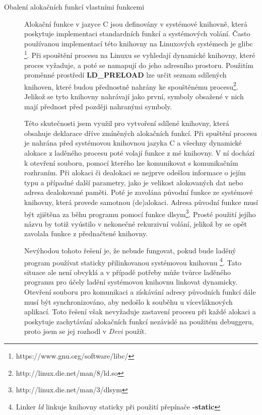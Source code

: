 \documentclass[bc,male,python,dept460]{diploma}						%
\newcommand{\parspace}[1][]{
	\ifthenelse{\isempty{#1}}{\vspace{5mm}}{\vspace{#1}}
	\par
}
\begin{document}
\begin{description}
\begin{description}
				\item[Obalení alokačních funkcí vlastními funkcemi] Alokační funkce v jazyce C jsou definovány v systémové knihovně, která poskytuje
				implementaci standardních funkcí a systémových volání. Často používanou implementací této knihovny na Linuxových systémech je glibc
				\footnote{https://www.gnu.org/software/libc/}. Při spouštění procesu na Linuxu se vyhledají dynamické knihovny, které proces vyžaduje,
				a poté se namapují do jeho adresního prostoru. Použitím proměnné prostředí \textbf{LD\_PRELOAD} lze určit
				seznam sdílených knihoven, které budou přednostně nahrány ke spouštěnému procesu\footnote{http://linux.die.net/man/8/ld.so}.
				Jelikož se tyto knihovny nahrávají jako první, symboly obsažené v nich mají přednost před později nahranými symboly.
				
				\parspace Této skutečnosti jsem využil pro vytvoření sdílené knihovny, která obsahuje deklarace dříve zmíněných alokačních funkcí.
				Při spuštění procesu je nahrána před systémovou knihovnou jazyka C a všechny dynamické alokace z laděného procesu poté volají funkce z mé knihovny.
				V ní dochází k otevření souboru, pomocí kterého lze komunikovat s komunikačním rozhraním. %
				Při alokaci či dealokaci se nejprve odešlou informace o jejím typu a případné další parametry, jako je velikost alokovaných dat
				nebo adresa dealokované paměti. Poté je zavolána původní funkce ze systémové knihovny, která provede samotnou (de)alokaci.
				Adresa původní funkce musí být zjištěna za běhu programu pomocí
				funkce dlsym\footnote{http://linux.die.net/man/3/dlsym}. Prosté použití jejího názvu by totiž vyústilo v nekonečné rekurzivní volání, jelikož
				by se opět zavolala funkce z přednačtené knihovny.
				
				\parspace Nevýhodou tohoto řešení je, že nebude fungovat, pokud bude laděný program používat staticky přilinkovanou systémovou knihovnu
				\footnote{Linker \textit{ld} linkuje knihovny staticky při použití přepínače \textbf{-static}}.
				Tato situace ale není obvyklá a v případě potřeby může tvůrce laděného programu pro účely ladění systémovou knihovnu linkovat dynamicky.
				Otevření souboru pro komunikaci a získávání adresy původních funkcí dále musí být synchronizováno, aby nedošlo k souběhu u vícevláknových aplikací.
				Toto řešení však nevyžaduje zastavení procesu při každé alokaci a poskytuje zachytávání alokačních funkcí nezávislé na použitém debuggeru, proto
				jsem se jej rozhodl v \textit{Devi} použít.
				
			\end{description}
			
			
		\end{description}
			
\end{document}
